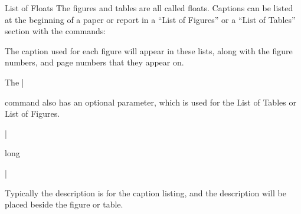 \begin{frame}[fragile]{List of Floats}
The figures and tables are all called floats. Captions can be listed at the beginning of a paper or report in a ``List of Figures'' or a ``List of Tables'' section with the commands:

\begin{command}
\begin{LCL}
\listoffigures
\listoftables
\end{LCL}
\end{command}

The caption used for each figure will appear in these lists, along with the figure numbers, and page numbers that they appear on. \medskip

The \LC|\caption| command also has an optional parameter, which is used for the List of Tables or List of Figures.  

\begin{command}
\LC|\caption[short]{long}|
\end{command}

Typically the  description is for the caption listing, and the  description will be placed beside the figure or table.

\end{frame}
